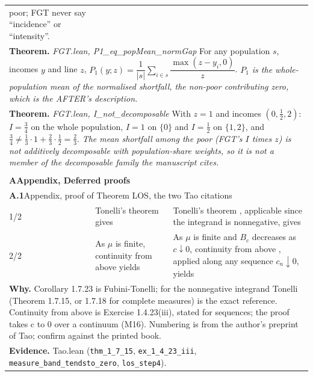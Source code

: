 \documentclass[10pt]{article}
\theoremstyle{definition}
\newlength{\fullw}\setlength{\fullw}{25.9cm}
\newcommand{\entryhead}[2]{\multicolumn{3}{|l|}{\rule{0pt}{2.6ex}\large\textbf{#1}\quad #2} \\ \hline}
\begin{document}
{\begin{longtable}{|p{0.9cm}|p{12.2cm}|p{12.2cm}|}
{{poor; FGT never say ``incidence'' or ``intensity''.}} \\
\multicolumn{3}{|p{\fullw}|}{\textbf{Theorem.} \textit{FGT.lean, P1\_eq\_popMean\_normGap} \newline For any population $s$, incomes $y$ and line $z$,
$P_1(y; z) = \dfrac{1}{|s|} \sum_{i \in s} \dfrac{\max(z - y_i, 0)}{z}$. \newline \textit{$P_1$ is the whole-population mean of the normalised shortfall,
the non-poor contributing zero, which is the AFTER's description.}} \\
\multicolumn{3}{|p{\fullw}|}{\textbf{Theorem.} \textit{FGT.lean, I\_not\_decomposable} \newline With $z = 1$ and incomes $(0, \tfrac12, 2)$: $I = \tfrac34$ on the
whole population, $I = 1$ on $\{0\}$ and $I = \tfrac12$ on $\{1, 2\}$, and
$\tfrac34 \neq \tfrac13 \cdot 1 + \tfrac23 \cdot \tfrac12 = \tfrac23$. \newline \textit{The mean shortfall among the poor (FGT's $I$ times $z$) is not
additively decomposable with population-share weights, so it is not a member
of the decomposable family the manuscript cites.}} \\ \hline
\multicolumn{3}{|l|}{} \\ \hline
\multicolumn{3}{|l|}{\rule{0pt}{3.2ex}\Large\textbf{A\quad Appendix, Deferred proofs}} \\ \hline\hline
\entryhead{A.1}{Appendix, proof of Theorem LOS, the two Tao citations\quad{\footnotesize\textit{(formerly C.14)}}}
1/2 & Tonelli's theorem \citep[Corollary~1.7.23]{tao2011measure} gives & Tonelli's theorem \citep[Theorem~1.7.15]{tao2011measure}, applicable since the integrand is nonnegative, gives \\ \hline
2/2 & As $\mu$ is finite, continuity from above \citep[\S1.4]{tao2011measure} yields & As $\mu$ is finite and $B_c$ decreases as $c\downarrow0$, continuity from above \citep[Exercise~1.4.23(iii)]{tao2011measure}, applied along any sequence $c_n\downarrow0$, yields \\ \hline
\multicolumn{3}{|p{\fullw}|}{\textbf{Why.} Corollary 1.7.23 is Fubini-Tonelli; for the nonnegative integrand Tonelli (Theorem 1.7.15, or 1.7.18 for complete measures) is the exact reference. Continuity from above is Exercise 1.4.23(iii), stated for sequences; the proof takes c to 0 over a continuum (M16). Numbering is from the author's preprint of Tao; confirm against the printed book.} \\
\multicolumn{3}{|p{\fullw}|}{\textbf{Evidence.} Tao.lean (\texttt{thm\_1\_7\_15}, \texttt{ex\_1\_4\_23\_iii}, \texttt{measure\_band\_tendsto\_zero}, \texttt{los\_step4}).} \\ \hline

\end{longtable}}
\end{document}
